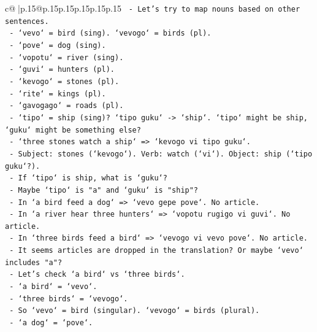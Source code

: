 \documentclass{article}
\begin{document}
{\begin{supertabular}{c@{$\;$}|p{.15\linewidth}@{}p{.15\linewidth}p{.15\linewidth}p{.15\linewidth}p{.15\linewidth}p{.15\linewidth}}
{{{\texttt{                 {-} Let's try to map nouns based on other sentences.} \\
\texttt{                   {-} `vevo` = bird (sing). `vevogo` = birds (pl).} \\
\texttt{                   {-} `pove` = dog (sing).} \\
\texttt{                   {-} `vopotu` = river (sing).} \\
\texttt{                   {-} `guvi` = hunters (pl).} \\
\texttt{                   {-} `kevogo` = stones (pl).} \\
\texttt{                   {-} `rite` = kings (pl).} \\
\texttt{                   {-} `gavogago` = roads (pl).} \\
\texttt{                   {-} `tipo` = ship (sing)? `tipo guku` {-}> `ship`. `tipo` might be ship, `guku` might be something else?} \\
\texttt{                     {-} `three stones watch a ship` => `kevogo vi tipo guku`.} \\
\texttt{                     {-} Subject: stones (`kevogo`). Verb: watch (`vi`). Object: ship (`tipo guku`?).} \\
\texttt{                     {-} If `tipo` is ship, what is `guku`?} \\
\texttt{                     {-} Maybe `tipo` is "a" and `guku` is "ship"?} \\
\texttt{                     {-} In `a bird feed a dog` => `vevo gepe pove`. No article.} \\
\texttt{                     {-} In `a river hear three hunters` => `vopotu rugigo vi guvi`. No article.} \\
\texttt{                     {-} In `three birds feed a bird` => `vevogo vi vevo pove`. No article.} \\
\texttt{                     {-} It seems articles are dropped in the translation? Or maybe `vevo` includes "a"?} \\
\texttt{                     {-} Let's check `a bird` vs `three birds`.} \\
\texttt{                       {-} `a bird` = `vevo`.} \\
\texttt{                       {-} `three birds` = `vevogo`.} \\
\texttt{                       {-} So `vevo` = bird (singular). `vevogo` = birds (plural).} \\
\texttt{                       {-} `a dog` = `pove`.} \\
}}}
\end{supertabular}}
\end{document}
